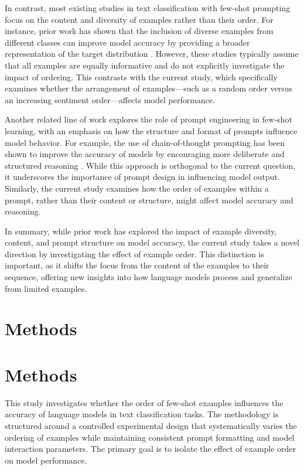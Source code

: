 \documentclass{article}
\begin{document}
In contrast, most existing studies in text classification with few-shot prompting focus on the content and diversity of examples rather than their order. For instance, prior work has shown that the inclusion of diverse examples from different classes can improve model accuracy by providing a broader representation of the target distribution \cite{DBLP:journals/corr/abs-2109-08668}. However, these studies typically assume that all examples are equally informative and do not explicitly investigate the impact of ordering. This contrasts with the current study, which specifically examines whether the arrangement of examples—such as a random order versus an increasing sentiment order—affects model performance. 

Another related line of work explores the role of prompt engineering in few-shot learning, with an emphasis on how the structure and format of prompts influence model behavior. For example, the use of chain-of-thought prompting has been shown to improve the accuracy of models by encouraging more deliberate and structured reasoning \cite{DBLP:journals/corr/abs-2201-11903}. While this approach is orthogonal to the current question, it underscores the importance of prompt design in influencing model output. Similarly, the current study examines how the order of examples within a prompt, rather than their content or structure, might affect model accuracy and reasoning. 

In summary, while prior work has explored the impact of example diversity, content, and prompt structure on model accuracy, the current study takes a novel direction by investigating the effect of example order. This distinction is important, as it shifts the focus from the content of the examples to their sequence, offering new insights into how language models process and generalize from limited examples.
\section{Methods}
\section{Methods}

This study investigates whether the order of few-shot examples influences the accuracy of language models in text classification tasks. The methodology is structured around a controlled experimental design that systematically varies the ordering of examples while maintaining consistent prompt formatting and model interaction parameters. The primary goal is to isolate the effect of example order on model performance.
\end{document}
